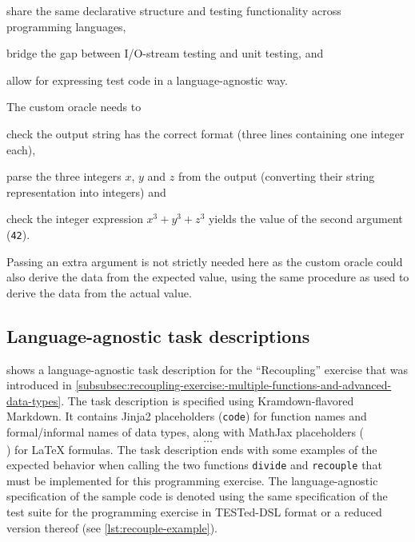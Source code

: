 \documentclass[../main]{subfiles}
\begin{document}
\begin{enumerate*}[label=\emph{\roman*})]
    \item share the same declarative structure and testing functionality across programming languages,
    \item bridge the gap between I/O-stream testing and unit testing, and
    \item allow for expressing test code in a language-agnostic way.
\end{enumerate*}

The custom oracle needs to
\begin{enumerate*}[label=\emph{\roman*})]
    \item check the output string has the correct format (three lines containing one integer each),
    \item parse the three integers $x$, $y$ and $z$ from the output (converting their string representation into integers) and
    \item check the integer expression $x^3 + y^3 + z^3$ yields the value of the second argument (\texttt{42}).
\end{enumerate*}
Passing an extra argument is not strictly needed here as the custom oracle could also derive the data from the expected value, using the same procedure as used to derive the data from the actual value.

\subsection{Language-agnostic task descriptions}\label{subsec:example-language-agnostic-task-descriptions}

 shows a language-agnostic task description for the ``Recoupling'' exercise that was introduced in \vref{subsubsec:recoupling-exercise:-multiple-functions-and-advanced-data-types}.
The task description is specified using Kramdown-flavored Markdown.
It contains Jinja2 placeholders (\texttt{{{code}}}) for function names and formal/informal names of data types, along with MathJax placeholders (\texttt{$$...$$}) for \LaTeX{} formulas.
The task description ends with some examples of the expected behavior when calling the two functions \texttt{divide} and \texttt{recouple} that must be implemented for this programming exercise.
The language-agnostic specification of the sample code is denoted using the same specification of the test suite for the programming exercise in TESTed-DSL format or a reduced version thereof (see \vref{lst:recouple-example}).
\end{document}

